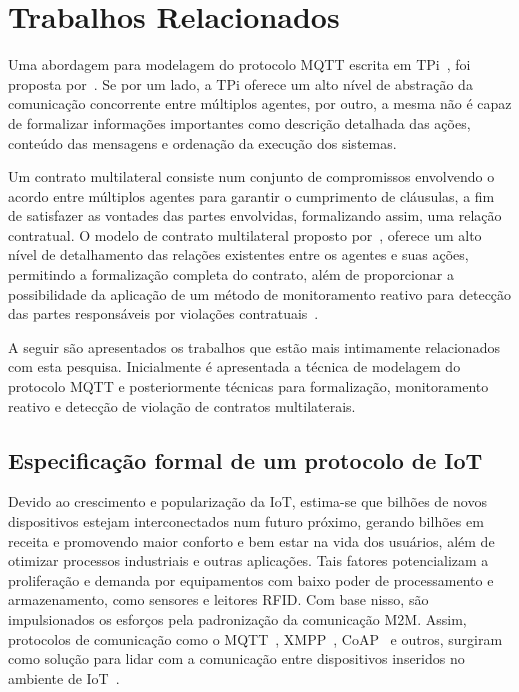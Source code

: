 \chapter{Trabalhos Relacionados}

Uma abordagem para modelagem do protocolo MQTT escrita em TPi~\cite{berger2003two}, foi proposta por~\citeauthor{aziz2016formal}. Se por um lado, a TPi oferece um alto nível de abstração da comunicação concorrente entre múltiplos agentes, por outro, a mesma não é capaz de formalizar informações importantes como descrição detalhada das ações, conteúdo das mensagens e ordenação da execução dos sistemas.

Um contrato multilateral consiste num conjunto de compromissos envolvendo o acordo entre múltiplos agentes para garantir o cumprimento de cláusulas, a fim de satisfazer as vontades das partes envolvidas, formalizando assim, uma relação contratual. O modelo de contrato multilateral proposto por~\citeauthor{xu2004multi}, oferece um alto nível de detalhamento das relações existentes entre os agentes e suas ações, permitindo a formalização completa do contrato, além de proporcionar a possibilidade da aplicação de um método de monitoramento reativo para detecção das partes responsáveis por violações contratuais~\cite{xu2004multi, xu2005detection}.

A seguir são apresentados os trabalhos que estão mais intimamente relacionados com esta pesquisa. Inicialmente é apresentada a técnica de modelagem do protocolo MQTT e posteriormente técnicas para formalização, monitoramento reativo e detecção de violação de contratos multilaterais.  

\section{Especificação formal de um protocolo de IoT} \label{sec:mqtt_model}

Devido ao crescimento e popularização da IoT, estima-se que bilhões de novos dispositivos estejam interconectados num futuro próximo, gerando bilhões em receita e promovendo maior conforto e bem estar na vida dos usuários, além de otimizar processos industriais e outras aplicações. Tais fatores potencializam a proliferação e demanda por equipamentos com baixo poder de processamento e armazenamento, como sensores e leitores RFID. Com base nisso, são impulsionados os esforços pela padronização da comunicação M2M. Assim, protocolos de comunicação como o MQTT~\cite{mqttv3.1.1}, XMPP~\cite{xmpp2011extensible}, CoAP~\cite{shelby2014constrained} e outros, surgiram como solução para lidar com a comunicação entre dispositivos inseridos no ambiente de IoT~\cite{aziz2016formal}.


